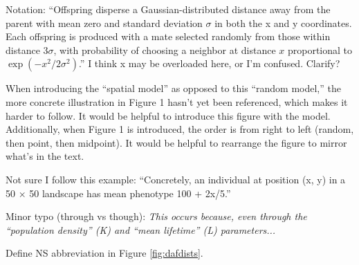 
\begin{point}{}
    Notation: ``Offspring disperse a Gaussian-distributed distance away from the parent with mean zero and standard deviation $\sigma$ in both the x and y coordinates. Each offspring is produced with a mate selected randomly from those within distance $3\sigma$, with probability of choosing a neighbor at distance $x$ proportional to $\exp(-x^2/2\sigma^2)$.'' I think x may be overloaded here, or I'm confused. Clarify?
\end{point}


\begin{point}{}
    When introducing the ``spatial model'' as opposed to this ``random model,'' the more concrete illustration in Figure 1 hasn't yet been referenced, which makes it harder to follow. It would be helpful to introduce this figure with the model. Additionally, when Figure 1 is introduced, the order is from right to left (random, then point, then midpoint). It would be helpful to rearrange the figure to mirror what's in the text.
\end{point}


\begin{point}{}
    Not sure I follow this example: ``Concretely, an individual at position (x, y) in a 50 × 50 landscape has mean phenotype 100 + 2x/5.''
\end{point}

\reply{
}

\begin{point}{}
    Minor typo (through vs though): \emph{This occurs because, even through the ``population density'' (K) and ``mean lifetime'' (L) parameters...}
\end{point}


\begin{point}{}
    Define NS abbreviation in Figure \ref{fig:dafdists}.
\end{point}


